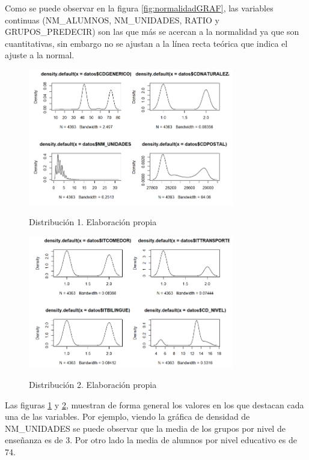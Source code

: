 \begin{subappendices}
Como se puede observar en la figura \ref{fig:normalidadGRAF}, las variables continuas (NM\_ALUMNOS, NM\_UNIDADES, RATIO y GRUPOS\_PREDECIR) son las que más se acercan a la normalidad ya que son cuantitativas, sin embargo no se ajustan a la línea recta teórica que indica el ajuste a la normal.


\begin{figure}[htb]
	\centering
	\caption{Distribución 1. Elaboración propia}
	\includegraphics[width=0.8\textwidth]{recursos/ImagenesR/norm1}
	\label{fig:norm1}
\end{figure}
\FloatBarrier

\begin{figure}[htb]
	\centering
	\caption{Distribución 2. Elaboración propia}
	\includegraphics[width=0.8\textwidth]{recursos/ImagenesR/norm2}
	\label{fig:norm2}
\end{figure}
\FloatBarrier

Las figuras \ref{fig:norm1} y \ref{fig:norm2}, muestran de forma general los valores en los que destacan cada una de las variables. Por ejemplo, viendo la gráfica de densidad de NM\_UNIDADES se puede observar que la media de los grupos por nivel de enseñanza es de 3. Por otro lado la media de alumnos por nivel educativo es de 74.


\end{subappendices}
